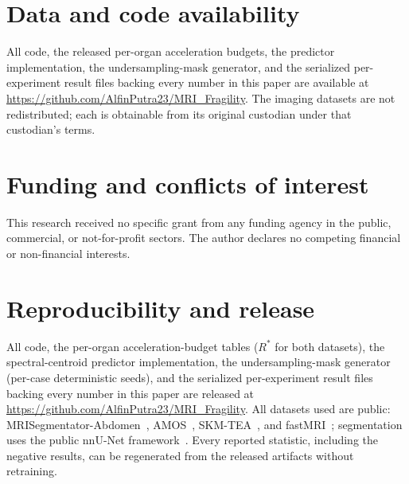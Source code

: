 \documentclass[10pt,twocolumn,letterpaper]{article}
\begin{document}
\section*{Data and code availability}
All code, the released per-organ acceleration budgets, the predictor implementation, the
undersampling-mask generator, and the serialized per-experiment result files backing every number in
this paper are available at \url{https://github.com/AlfinPutra23/MRI_Fragility}. The imaging datasets
are not redistributed; each is obtainable from its original custodian under that custodian's terms.

\section*{Funding and conflicts of interest}
This research received no specific grant from any funding agency in the public, commercial, or
not-for-profit sectors. The author declares no competing financial or non-financial interests.

\section*{Reproducibility and release}

All code, the per-organ acceleration-budget tables ($R^{*}$ for both datasets), the spectral-centroid predictor implementation, the undersampling-mask generator (per-case deterministic seeds), and the serialized per-experiment result files backing every number in this paper are released at \url{https://github.com/AlfinPutra23/MRI_Fragility}. All datasets used are public: MRISegmentator-Abdomen~\cite{mrisegmentator2024}, AMOS~\cite{amos2022}, SKM-TEA~\cite{desai2022skmtea}, and fastMRI~\cite{zbontar2018fastmri}; segmentation uses the public nnU-Net framework~\cite{isensee2021}. Every reported statistic, including the negative results, can be regenerated from the released artifacts without retraining.
\end{document}
